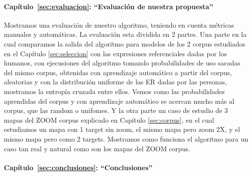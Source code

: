 \paragraph{Cap\'itulo~\ref{sec:evaluacion}: ``Evaluaci\'on de nuestra propuesta''}
Mostramos una evaluaci\'on de nuestro algoritmo, teniendo en cuenta m\'etricas manuales y autom\'aticas. La evaluaci\'on esta dividida en 2 partes. Una parte en la cual comparamos la salida del algoritmo para modelos de los 2 corpus estudiados en el Cap\'itulo \ref{sec:seleccion} con las expresiones referenciales dadas por los humanos, con ejecusiones del algoritmo tomando probabilidades de uso sacadas del mismo corpus, obtenidas con aprendizaje autom\'atico a partir del corpus, aleatorias y con la distribuci\'on uniforme de las ER dadas por las personas, mostramos la entrop\'ia cruzada entre ellos. Vemos como las probabilidades aprendidas del corpus y con aprendizaje autom\'atico se acercan mucho m\'as al corpus, que las random o unifomes. Y la otra parte un caso de estudio de 3 mapas del ZOOM corpus explicado en Cap\'itulo \ref{sec:corpus}, en el cual estudiamos un mapa con 1 target sin zoom, el mismo mapa pero zoom 2X, y el mismo mapa pero como 2 targets. Mostramos como funciona el algoritmo para un caso tan real y natural como son los mapas del ZOOM corpus. 

\paragraph{Cap\'itulo~\ref{sec:conclusiones}: ``Conclusiones''}


